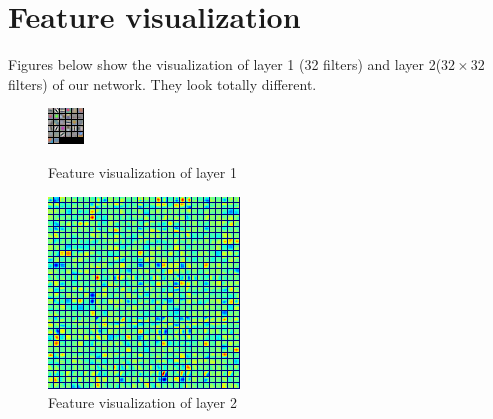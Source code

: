 \documentclass{article} %
\begin{document}
\section{Feature visualization}
Figures below show the visualization of layer 1 (32 filters) and layer 2($32\times32$ filters) of our network. They look totally different.
\begin{figure}[H]
    \begin{minipage}{0.5\linewidth}
        \centering
        \includegraphics[scale=2.0]{layer1.png}
        \caption{Feature visualization of layer 1}
    \end{minipage}
    \begin{minipage}{0.5\linewidth}
        \centering
        \includegraphics[scale=2.0]{layer2.png}
     \caption{Feature visualization of layer 2}
    \end{minipage}
\end{figure}
\end{document}
